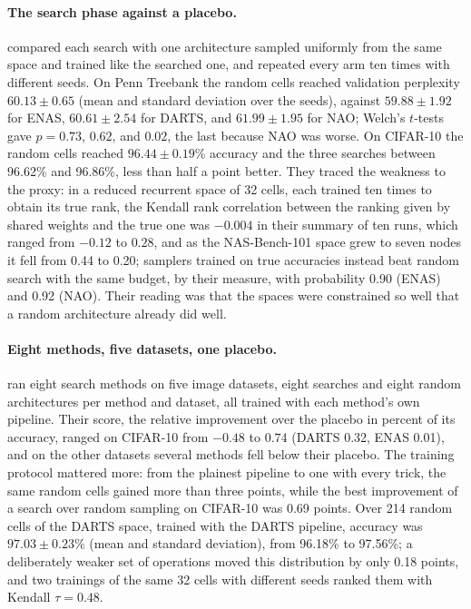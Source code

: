 \begin{refsection}
\paragraph{The search phase against a placebo.} \Textcite{YuEtAl2020} compared each search with one architecture sampled uniformly from the same space and trained like the searched one, and repeated every arm ten times with different seeds. On Penn Treebank the random cells reached validation perplexity $60.13\pm0.65$ (mean and standard deviation over the seeds), against $59.88\pm1.92$ for ENAS, $60.61\pm2.54$ for DARTS, and $61.99\pm1.95$ for NAO; Welch's $t$-tests gave $p=0.73$, $0.62$, and $0.02$, the last because NAO was worse. On CIFAR-10 the random cells reached $96.44\pm0.19$\% accuracy and the three searches between 96.62\% and 96.86\%, less than half a point better. They traced the weakness to the proxy: in a reduced recurrent space of 32 cells, each trained ten times to obtain its true rank, the Kendall rank correlation between the ranking given by shared weights and the true one was $-0.004$ in their summary of ten runs, which ranged from $-0.12$ to $0.28$, and as the NAS-Bench-101 space grew to seven nodes it fell from 0.44 to 0.20; samplers trained on true accuracies instead beat random search with the same budget, by their measure, with probability 0.90 (ENAS) and 0.92 (NAO). Their reading was that the spaces were constrained so well that a random architecture already did well.

\paragraph{Eight methods, five datasets, one placebo.} \Textcite{YangEsperancaCarlucci2020} ran eight search methods on five image datasets, eight searches and eight random architectures per method and dataset, all trained with each method's own pipeline. Their score, the relative improvement over the placebo in percent of its accuracy, ranged on CIFAR-10 from $-0.48$ to $0.74$ (DARTS 0.32, ENAS 0.01), and on the other datasets several methods fell below their placebo. The training protocol mattered more: from the plainest pipeline to one with every trick, the same random cells gained more than three points, while the best improvement of a search over random sampling on CIFAR-10 was 0.69 points. Over 214 random cells of the DARTS space, trained with the DARTS pipeline, accuracy was $97.03\pm0.23$\% (mean and standard deviation), from 96.18\% to 97.56\%; a deliberately weaker set of operations moved this distribution by only 0.18 points, and two trainings of the same 32 cells with different seeds ranked them with Kendall $\tau=0.48$.


\end{refsection}
